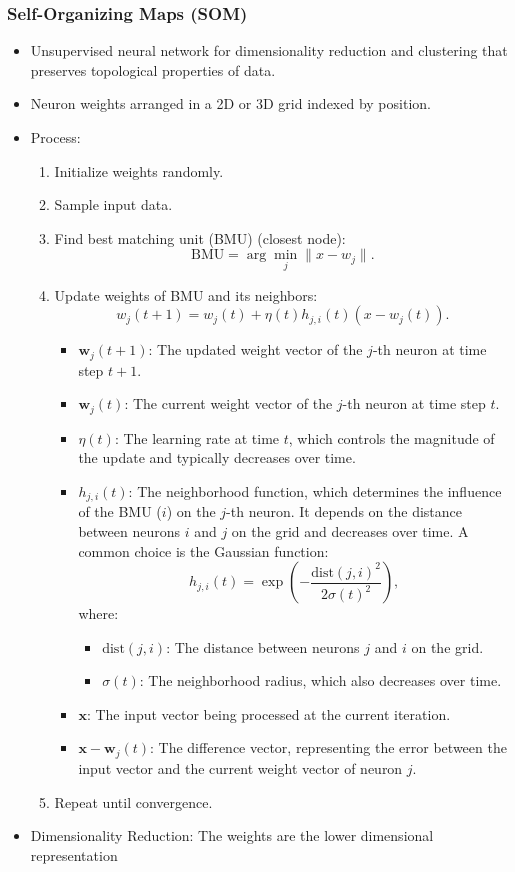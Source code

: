 \documentclass[12pt,a4paper]{article}
\begin{document}
\subsubsection{Self-Organizing Maps (SOM)}
\begin{itemize}
    \item Unsupervised neural network for dimensionality reduction and clustering that preserves topological properties of data.
    \item Neuron weights arranged in a 2D or 3D grid indexed by position.
    \item Process:
    \begin{enumerate}
        \item Initialize weights randomly.
        \item Sample input data.
        \item Find best matching unit (BMU) (closest node):
        \[ \text{BMU} = \arg\min_j \|x - w_j\|. \]
        \item Update weights of BMU and its neighbors:
        \[ w_j(t+1) = w_j(t) + \eta(t) h_{j,i}(t)(x - w_j(t)). \]
        \begin{itemize}
    \item \( \mathbf{w}_j(t+1) \): The updated weight vector of the \( j \)-th neuron at time step \( t+1 \).
    \item \( \mathbf{w}_j(t) \): The current weight vector of the \( j \)-th neuron at time step \( t \).
    \item \( \eta(t) \): The learning rate at time \( t \), which controls the magnitude of the update and typically decreases over time.
    \item \( h_{j,i}(t) \): The neighborhood function, which determines the influence of the BMU (\( i \)) on the \( j \)-th neuron. It depends on the distance between neurons \( i \) and \( j \) on the grid and decreases over time. A common choice is the Gaussian function:
    \[
    h_{j,i}(t) = \exp\left(-\frac{\text{dist}(j, i)^2}{2\sigma(t)^2}\right),
    \]
    where:
    \begin{itemize}
        \item \( \text{dist}(j, i) \): The distance between neurons \( j \) and \( i \) on the grid.
        \item \( \sigma(t) \): The neighborhood radius, which also decreases over time.
    \end{itemize}
    \item \( \mathbf{x} \): The input vector being processed at the current iteration.
    \item \( \mathbf{x} - \mathbf{w}_j(t) \): The difference vector, representing the error between the input vector and the current weight vector of neuron \( j \).
\end{itemize}
        \item Repeat until convergence.
    \end{enumerate}
    \item Dimensionality Reduction: The weights are the lower dimensional representation


\end{itemize}
\end{document}
